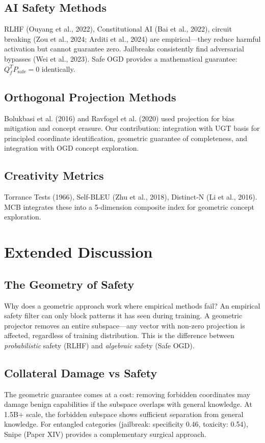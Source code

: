 \documentclass[11pt,a4paper]{article}
\theoremstyle{plain}\newtheorem{theorem}{Theorem}[section]
\begin{document}
\subsection{AI Safety Methods}
RLHF (Ouyang et al., 2022), Constitutional AI (Bai et al., 2022), circuit breaking (Zou et al., 2024; Arditi et al., 2024) are empirical---they reduce harmful activation but cannot guarantee zero. Jailbreaks consistently find adversarial bypasses (Wei et al., 2023). Safe OGD provides a mathematical guarantee: $Q_f^T P_{\mathrm{safe}} = 0$ identically.

\subsection{Orthogonal Projection Methods}
Bolukbasi et al. (2016) and Ravfogel et al. (2020) used projection for bias mitigation and concept erasure. Our contribution: integration with UGT basis for principled coordinate identification, geometric guarantee of completeness, and integration with OGD concept exploration.

\subsection{Creativity Metrics}
Torrance Tests (1966), Self-BLEU (Zhu et al., 2018), Distinct-N (Li et al., 2016). MCB integrates these into a 5-dimension composite index for geometric concept exploration.

\newpage

\section{Extended Discussion}

\subsection{The Geometry of Safety}
Why does a geometric approach work where empirical methods fail? An empirical safety filter can only block patterns it has seen during training. A geometric projector removes an entire subspace---any vector with non-zero projection is affected, regardless of training distribution. This is the difference between \textit{probabilistic} safety (RLHF) and \textit{algebraic} safety (Safe OGD).

\subsection{Collateral Damage vs Safety}
The geometric guarantee comes at a cost: removing forbidden coordinates may damage benign capabilities if the subspace overlaps with general knowledge. At 1.5B+ scale, the forbidden subspace shows sufficient separation from general knowledge. For entangled categories (jailbreak: specificity 0.46, toxicity: 0.54), Snipe (Paper XIV) provides a complementary surgical approach.
\end{document}
